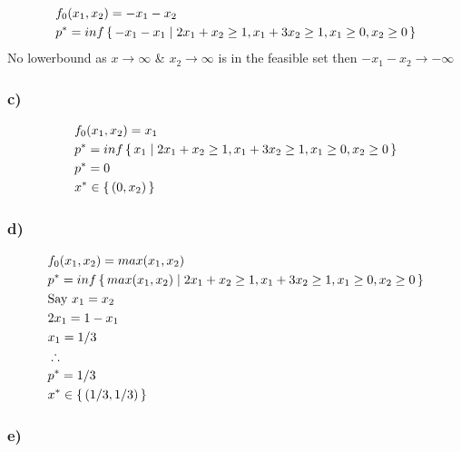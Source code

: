 \documentclass[12pt]{article}
\begin{document}
\begin{equation*}
\begin{aligned}
& f_0(x_1, x_2)= -x_1 - x_2\\
& p^* = inf\set{-x_1 - x_1 | 2x_1 + x_2 \ge 1, x_1 + 3x_2 \ge 1, x_1 \ge 0, x_2 \ge 0}\\
\end{aligned}
\end{equation*}
No lowerbound as $x \rightarrow \infty$ \& $x_2 \rightarrow \infty$ is in the feasible set then $-x_1 - x_2 \rightarrow -\infty$

\subsubsection*{c)}

\begin{equation*}
\begin{aligned}
& f_0(x_1, x_2)= x_1\\
& p^* = inf\set{x_1 | 2x_1 + x_2 \ge 1, x_1 + 3x_2 \ge 1, x_1 \ge 0, x_2 \ge 0}\\
& p^* = 0\\
& x^* \in \set{(0, x_2)}
\end{aligned}
\end{equation*}

\subsubsection*{d)}

\begin{equation*}
\begin{aligned}
& f_0(x_1, x_2)= max(x_1, x_2)\\
& p^* = inf\set{max(x_1, x_2) | 2x_1 + x_2 \ge 1, x_1 + 3x_2 \ge 1, x_1 \ge 0, x_2 \ge 0}\\
& \text{Say } x_1 = x_2\\
& 2x_1 = 1- x_1\\
& x_1 = 1/3\\
& \therefore\\
& p^* = 1/3\\
& x^* \in \set{(1/3, 1/3)}
\end{aligned}
\end{equation*}

\subsubsection*{e)}
\end{document}
